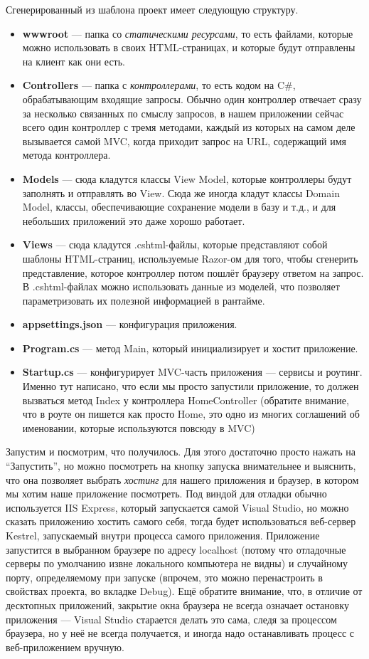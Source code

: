 \documentclass[a5paper]{article}
\begin{document}
Сгенерированный из шаблона проект имеет следующую структуру.
\begin{itemize}
    \item \textbf{wwwroot} --- папка со \textit{статическими ресурсами}, то есть файлами, которые можно использовать в своих HTML-страницах, и которые будут отправлены на клиент как они есть.
    \item \textbf{Controllers} --- папка с \textit{контроллерами}, то есть кодом на C\#, обрабатывающим входящие запросы. Обычно один контроллер отвечает сразу за несколько связанных по смыслу запросов,
        в нашем приложении сейчас всего один контроллер с тремя методами, каждый из которых на самом деле вызывается самой MVC, когда приходит запрос на URL, содержащий имя метода контроллера.
    \item \textbf{Models} --- сюда кладутся классы View Model, которые контроллеры будут заполнять и отправлять во View. Сюда же иногда кладут классы Domain Model, классы, обеспечивающие сохранение модели в базу и т.д., и для небольших приложений это даже хорошо работает.
    \item \textbf{Views} --- сюда кладутся .cshtml-файлы, которые представляют собой шаблоны HTML-страниц, используемые Razor-ом для того, чтобы сгенерить представление, которое контроллер потом пошлёт браузеру ответом на запрос. В .cshtml-файлах можно использовать
        данные из моделей, что позволяет параметризовать их полезной информацией в рантайме.
    \item \textbf{appsettings.json} --- конфигурация приложения.
    \item \textbf{Program.cs} --- метод Main, который инициализирует и хостит приложение.
    \item \textbf{Startup.cs} --- конфигурирует MVC-часть приложения --- сервисы и роутинг. Именно тут написано, что если мы просто запустили приложение, то должен вызваться метод Index у контроллера HomeController (обратите внимание, что в роуте он пишется как просто Home, 
        это одно из многих соглашений об именовании, которые используются повсюду в MVC)
\end{itemize}

Запустим и посмотрим, что получилось. Для этого достаточно просто нажать на ``Запустить'', но можно посмотреть на кнопку запуска внимательнее и выяснить, что она позволяет выбрать \textit{хостинг} для нашего приложения и браузер, в котором мы хотим наше приложение посмотреть.
Под виндой для отладки обычно используется IIS Express, который запускается самой Visual Studio, но можно сказать приложению хостить самого себя, тогда будет использоваться веб-сервер Kestrel, запускаемый внутри процесса самого приложения. Приложение запустится в выбранном браузере
по адресу localhost (потому что отладочные серверы по умолчанию извне локального компьютера не видны) и случайному порту, определяемому при запуске (впрочем, это можно перенастроить в свойствах проекта, во вкладке Debug). Ещё обратите внимание, что, в отличие от десктопных приложений,
закрытие окна браузера не всегда означает остановку приложения --- Visual Studio старается делать это сама, следя за процессом браузера, но у неё не всегда получается, и иногда надо останавливать процесс с веб-приложением вручную.
\end{document}
